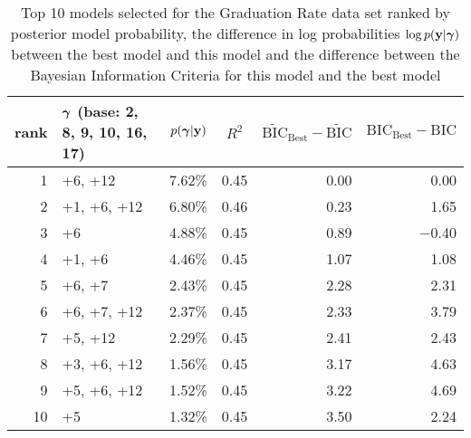\documentclass{article}[12pt]
\begin{document}
\begin{table}
	\label{tab:numerical_results_gradrate}
	\caption{Top 10 models selected for the Graduation Rate data set ranked by posterior model probability, the
		difference in log probabilities $\log p({\bf y}|{\boldsymbol \gamma})$ between the best model and this model and the difference between the Bayesian Information Criteria for this model and the best model}
	\begin{center}
		\begin{tabular}{r|l|r|c|r|r}
			rank & ${\boldsymbol \gamma}$ (base: 2, 8, 9, 10, 16, 17) & $p({\boldsymbol \gamma}|{\bf y})$ & $R^2$ & $\widetilde{\text{BIC}}_\text{Best} - \widetilde{\text{BIC}}$ & $\text{BIC}_\text{Best} - \text{BIC}$ \\
			\hline
			1 &  +6, +12&  7.62\%&  0.45&  0.00&  0.00\\
			2 &  +1, +6, +12&  6.80\%&  0.46&  0.23&  1.65\\
			3 &  +6&  4.88\%&  0.45&  0.89&  $-$0.40\\
			4 &  +1, +6&  4.46\%&  0.45&  1.07&  1.08\\
			5 &  +6, +7&  2.43\%&  0.45&  2.28&  2.31\\
			6 &  +6, +7, +12&  2.37\%&  0.45&  2.33&  3.79\\
			7 &  +5, +12&  2.29\%&  0.45&  2.41&  2.43\\
			8 &  +3, +6, +12&  1.56\%&  0.45&  3.17&  4.63\\
			9 &  +5, +6, +12&  1.52\%&  0.45&  3.22&  4.69\\
			10 &  +5&  1.32\%&  0.45&  3.50&  2.24\\
		\end{tabular}
	\end{center}
\end{table}
\end{document}
